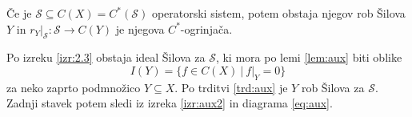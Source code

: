 \begin{posledica}[Šilov]
    Če je $\mathcal{S} \subseteq C(X) = C^*(\mathcal{S})$ operatorski sistem, potem obstaja njegov rob Šilova $Y$
    in $r_Y |_{\mathcal{S}}: \mathcal{S} \to C(Y)$ je njegova $C^*$-ogrinjača.
\end{posledica}

\begin{dokaz}
    Po izreku \ref{izr:2.3} obstaja ideal Šilova za $\mathcal{S}$, ki mora po lemi \ref{lem:aux} biti oblike 
    $$I(Y) = \{f \in C(X)\ |\ f|_Y = 0\}$$ za neko zaprto podmnožico $Y \subseteq X$. 
    Po trditvi \ref{trd:aux} je $Y$ rob Šilova za $\mathcal{S}$.    
    Zadnji stavek potem sledi iz izreka \ref{izr:aux2} in diagrama \eqref{eq:aux}.
\end{dokaz}

